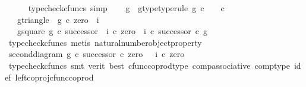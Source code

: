 \begin{isabellebody}
\ \ \ \ \isamarkupfalse%
\ {\isacharparenleft}{\kern0pt}typecheck{\isacharunderscore}{\kern0pt}cfuncs{\isacharcomma}{\kern0pt}\ simp{\isacharparenright}{\kern0pt}\isanewline
\ \ \isamarkupfalse%
\ g\ \ g{\isacharunderscore}{\kern0pt}type{\isacharbrackleft}{\kern0pt}type{\isacharunderscore}{\kern0pt}rule{\isacharbrackright}{\kern0pt}{\isacharcolon}{\kern0pt}\ {\isachardoublequoteopen}g{\isacharcolon}{\kern0pt}\ {\isasymnat}\isactrlsub c\ {\isasymrightarrow}\ {\isacharparenleft}{\kern0pt}{\isasymone}\ {\isasymCoprod}\ {\isasymnat}\isactrlsub c{\isacharparenright}{\kern0pt}{\isachardoublequoteclose}\ \isanewline
\ \ \ g{\isacharunderscore}{\kern0pt}triangle{\isacharcolon}{\kern0pt}\ {\isachardoublequoteopen}\ g\ {\isasymcirc}\isactrlsub c\ zero\ {\isacharequal}{\kern0pt}\ i{}{\isachardoublequoteclose}\ \isanewline
\ \ \ g{\isacharunderscore}{\kern0pt}square{\isacharcolon}{\kern0pt}\ {\isachardoublequoteopen}g\ {\isasymcirc}\isactrlsub c\ successor\ {\isacharequal}{\kern0pt}\ {\isacharparenleft}{\kern0pt}{\isacharparenleft}{\kern0pt}i{}\ {\isasymcirc}\isactrlsub c\ zero{\isacharparenright}{\kern0pt}\ {\isasymamalg}\ {\isacharparenleft}{\kern0pt}i{}\ {\isasymcirc}\isactrlsub c\ successor{\isacharparenright}{\kern0pt}{\isacharparenright}{\kern0pt}\ {\isasymcirc}\isactrlsub c\ g{\isachardoublequoteclose}\isanewline
\ \ \ \ \isamarkupfalse%
\ {\isacharparenleft}{\kern0pt}typecheck{\isacharunderscore}{\kern0pt}cfuncs{\isacharcomma}{\kern0pt}\ metis\ natural{\isacharunderscore}{\kern0pt}number{\isacharunderscore}{\kern0pt}object{\isacharunderscore}{\kern0pt}property{\isacharparenright}{\kern0pt}\isanewline
\ \ \isamarkupfalse%
\ \isamarkupfalse%
\ second{\isacharunderscore}{\kern0pt}diagram{}{\isacharcolon}{\kern0pt}\ {\isachardoublequoteopen}g\ {\isasymcirc}\isactrlsub c\ {\isacharparenleft}{\kern0pt}successor\ {\isasymcirc}\isactrlsub c\ zero{\isacharparenright}{\kern0pt}\ \ {\isacharequal}{\kern0pt}\ {\isacharparenleft}{\kern0pt}i{}\ {\isasymcirc}\isactrlsub c\ zero{\isacharparenright}{\kern0pt}{\isachardoublequoteclose}\isanewline
\ \ \ \ \isamarkupfalse%
\ {\isacharparenleft}{\kern0pt}typecheck{\isacharunderscore}{\kern0pt}cfuncs{\isacharcomma}{\kern0pt}\ smt\ {\isacharparenleft}{\kern0pt}verit{\isacharcomma}{\kern0pt}\ best{\isacharparenright}{\kern0pt}\ cfunc{\isacharunderscore}{\kern0pt}coprod{\isacharunderscore}{\kern0pt}type\ comp{\isacharunderscore}{\kern0pt}associative{}\ comp{\isacharunderscore}{\kern0pt}type\ i{}{\isacharunderscore}{\kern0pt}def\ left{\isacharunderscore}{\kern0pt}coproj{\isacharunderscore}{\kern0pt}cfunc{\isacharunderscore}{\kern0pt}coprod{\isacharparenright}{\kern0pt}\isanewline

\end{isabellebody}
